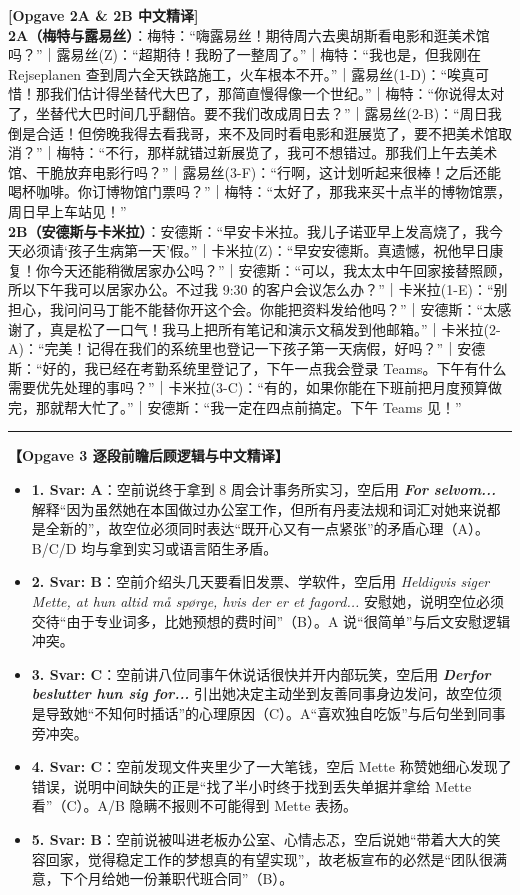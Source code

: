 \begin{answerbox}
\textbf{\color{NCDTeal}[Opgave 2A \& 2B 中文精译]}\\
\textbf{2A（梅特与露易丝）}：梅特：“嗨露易丝！期待周六去奥胡斯看电影和逛美术馆吗？”｜露易丝(Z)：“超期待！我盼了一整周了。”｜梅特：“我也是，但我刚在 Rejseplanen 查到周六全天铁路施工，火车根本不开。”｜露易丝(1-D)：“唉真可惜！那我们估计得坐替代大巴了，那简直慢得像一个世纪。”｜梅特：“你说得太对了，坐替代大巴时间几乎翻倍。要不我们改成周日去？”｜露易丝(2-B)：“周日我倒是合适！但傍晚我得去看我哥，来不及同时看电影和逛展览了，要不把美术馆取消？”｜梅特：“不行，那样就错过新展览了，我可不想错过。那我们上午去美术馆、干脆放弃电影行吗？”｜露易丝(3-F)：“行啊，这计划听起来很棒！之后还能喝杯咖啡。你订博物馆门票吗？”｜梅特：“太好了，那我来买十点半的博物馆票，周日早上车站见！”\\
\textbf{2B（安德斯与卡米拉）}：安德斯：“早安卡米拉。我儿子诺亚早上发高烧了，我今天必须请‘孩子生病第一天’假。”｜卡米拉(Z)：“早安安德斯。真遗憾，祝他早日康复！你今天还能稍微居家办公吗？”｜安德斯：“可以，我太太中午回家接替照顾，所以下午我可以居家办公。不过我 9:30 的客户会议怎么办？”｜卡米拉(1-E)：“别担心，我问问马丁能不能替你开这个会。你能把资料发给他吗？”｜安德斯：“太感谢了，真是松了一口气！我马上把所有笔记和演示文稿发到他邮箱。”｜卡米拉(2-A)：“完美！记得在我们的系统里也登记一下孩子第一天病假，好吗？”｜安德斯：“好的，我已经在考勤系统里登记了，下午一点我会登录 Teams。下午有什么需要优先处理的事吗？”｜卡米拉(3-C)：“有的，如果你能在下班前把月度预算做完，那就帮大忙了。”｜安德斯：“我一定在四点前搞定。下午 Teams 见！”

\vspace{0.45em}
\hrule
\vspace{0.45em}
\textbf{\color{NCDNavy}【Opgave 3 逐段前瞻后顾逻辑与中文精译】}
\begin{itemize}
  \item \textbf{1. Svar: A}：空前说终于拿到 8 周会计事务所实习，空后用 \textbf{\textit{For selvom...}} 解释“因为虽然她在本国做过办公室工作，但所有丹麦法规和词汇对她来说都是全新的”，故空位必须同时表达“既开心又有一点紧张”的矛盾心理（A）。B/C/D 均与拿到实习或语言陌生矛盾。
  \item \textbf{2. Svar: B}：空前介绍头几天要看旧发票、学软件，空后用 \textit{Heldigvis siger Mette, at hun altid må spørge, hvis der er et fagord...} 安慰她，说明空位必须交待“由于专业词多，比她预想的费时间”（B）。A 说“很简单”与后文安慰逻辑冲突。
  \item \textbf{3. Svar: C}：空前讲八位同事午休说话很快并开内部玩笑，空后用 \textbf{\textit{Derfor beslutter hun sig for...}} 引出她决定主动坐到友善同事身边发问，故空位须是导致她“不知何时插话”的心理原因（C）。A“喜欢独自吃饭”与后句坐到同事旁冲突。
  \item \textbf{4. Svar: C}：空前发现文件夹里少了一大笔钱，空后 Mette 称赞她细心发现了错误，说明中间缺失的正是“找了半小时终于找到丢失单据并拿给 Mette 看”（C）。A/B 隐瞒不报则不可能得到 Mette 表扬。
  \item \textbf{5. Svar: B}：空前说被叫进老板办公室、心情忐忑，空后说她“带着大大的笑容回家，觉得稳定工作的梦想真的有望实现”，故老板宣布的必然是“团队很满意，下个月给她一份兼职代班合同”（B）。
\end{itemize}


\end{answerbox}

